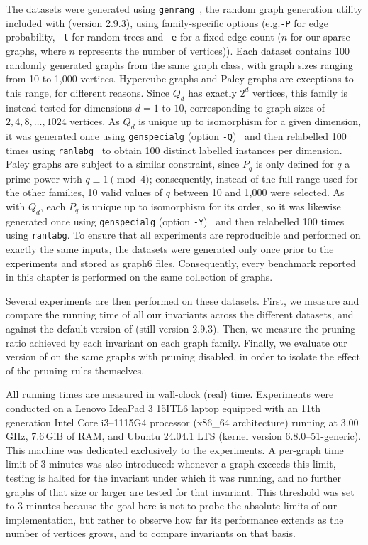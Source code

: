 The datasets were generated using \texttt{genrang}~\cite{mckay2024nug}, the random graph generation utility included with \Naut{} (version 2.9.3), using family-specific options (e.g.\texttt{-P} for edge probability, \texttt{-t} for random trees and \texttt{-e} for a fixed edge count ($n$ for our sparse graphs, where $n$ represents the number of vertices)). Each dataset contains 100 randomly generated graphs from the same graph class, with graph sizes ranging from 10 to 1,000 vertices. Hypercube graphs and Paley graphs are exceptions to this range, for different reasons. Since $Q_d$ has exactly $2^d$ vertices, this family is instead tested for dimensions $d = 1$ to $10$, corresponding to graph sizes of $2, 4, 8, \ldots, 1024$ vertices. As $Q_d$ is unique up to isomorphism for a given dimension, it was generated once using \texttt{genspecialg} (option \texttt{-Q})~\cite{mckay2024nug} and then relabelled 100 times using \texttt{ranlabg}~\cite{mckay2024nug} to obtain 100 distinct labelled instances per dimension. Paley graphs are subject to a similar constraint, since $P_q$ is only defined for $q$ a prime power with $q \equiv 1 \pmod 4$; consequently, instead of the full range used for the other families, 10 valid values of $q$ between 10 and 1,000 were selected. As with $Q_d$, each $P_q$ is unique up to isomorphism for its order, so it was likewise generated once using \texttt{genspecialg} (option \texttt{-Y})~\cite{mckay2024nug} and then relabelled 100 times using \texttt{ranlabg}. To ensure that all experiments are reproducible and performed on exactly the same inputs, the datasets were generated only once prior to the experiments and stored as graph6 files. Consequently, every benchmark reported in this chapter is performed on the same collection of graphs.

Several experiments are then performed on these datasets. First, we measure and compare the running time of all our invariants across the different datasets, and against the default version of \Naut{} (still version 2.9.3). Then, we measure the pruning ratio achieved by each invariant on each graph family. Finally, we evaluate our version of \Naut{} on the same graphs with pruning disabled, in order to isolate the effect of the pruning rules themselves.

All running times are measured in wall-clock (real) time. Experiments were conducted on a Lenovo IdeaPad 3 15ITL6 laptop equipped with an 11th generation Intel Core i3--1115G4 processor (x86\_64 architecture) running at 3.00\,GHz, 7.6\,GiB of RAM, and Ubuntu 24.04.1 LTS (kernel version 6.8.0--51-generic). This machine was dedicated exclusively to the experiments. A per-graph time limit of 3 minutes was also introduced: whenever a graph exceeds this limit, testing is halted for the invariant under which it was running, and no further graphs of that size or larger are tested for that invariant. This threshold was set to 3 minutes because the goal here is not to probe the absolute limits of our implementation, but rather to observe how far its performance extends as the number of vertices grows, and to compare invariants on that basis.


